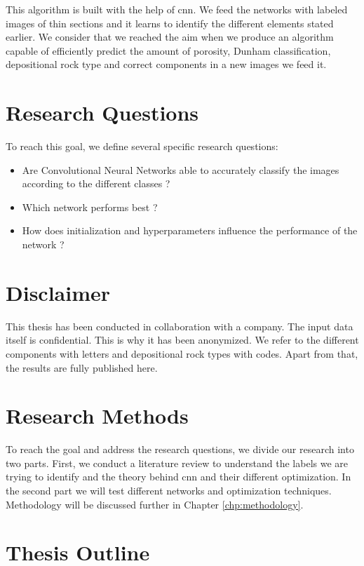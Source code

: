 This algorithm is built with the help of \gls{cnn}. We feed the networks with labeled images of thin sections and it learns to identify the different elements stated earlier. We consider that we reached the aim when we produce an algorithm capable of efficiently predict the amount of porosity, Dunham classification, depositional rock type and correct components in a new images we feed it. 

\section{Research Questions}
To reach this goal, we define several specific research questions: 
\begin{itemize}
    \item Are Convolutional Neural Networks able to accurately classify the images according to the different classes ?
    \item Which network performs best ?
    \item How does initialization and hyperparameters influence the performance of the network ?
\end{itemize}

\section{Disclaimer}
This thesis has been conducted in collaboration with a company. The input data itself is confidential. This is why it has been anonymized. We refer to the different components with letters and depositional rock types with codes. Apart from that, the results are fully published here.  

\section{Research Methods}\label{sec:research-method}
To reach the goal and address the research questions, we divide our research into two parts. First, we conduct a literature review to understand the labels we are trying to identify and the theory behind \gls{cnn} and their different optimization. In the second part we will test different networks and optimization techniques. Methodology will be discussed further in Chapter \ref{chp:methodology}.

\section{Thesis Outline}

